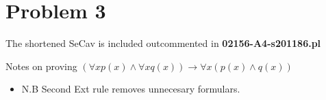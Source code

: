 \newpage
\section*{Problem 3}
The shortened SeCav is included outcommented in \textbf{02156-A4-s201186.pl}

Notes on proving $(\forall x p(x) \land \forall x q(x)) \to \forall x (p(x) \land q(x))$
\begin{itemize}
    \item N.B Second Ext rule removes unnecesary formulars.
\end{itemize}